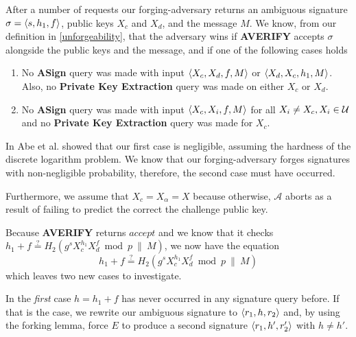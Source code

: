 After a number of requests our forging-adversary returns an ambiguous signature \(\sigma = \langle s,h_1, f \rangle\), public keys \(X_c\) and \(X_d\), and the message \(M\).
We know, from our definition in \autoref{unforgeability}, that the adversary wins if \textbf{AVERIFY} accepts \(\sigma\) alongside the public keys and the message, and if one of the following cases holds
  \begin{enumerate}
    \item No \textbf{ASign} query was made with input \(\langle X_c, X_d, f, M \rangle\) or \(\langle X_d, X_c, h_1, M \rangle\).
          Also, no \textbf{Private Key Extraction} query was made on either \(X_c\) or \(X_d\).
    \item No \textbf{ASign} query was made with input \(\langle X_c, X_i, f, M \rangle\) for all \(X_i \neq X_c, X_i\in\mathcal{U}\) and no \textbf{Private Key Extraction} query was made for \(X_c\).
  \end{enumerate}

In \cite{abe20021} Abe et al. showed that our first case is negligible, assuming the hardness of the discrete logarithm problem. 
We know that our forging-adversary forges signatures with non-negligible probability, therefore, the second case must have occurred.

Furthermore, we assume that \(X_c = X_\alpha = X\) because otherwise, \(\mathcal{A}\) aborts as a result of failing to predict the correct the challenge public key.

Because \textbf{AVERIFY} returns \(accept\) and we know that it checks \(h_1 + f \overset{?}{=} H_2(g^s X_{c}^{h_1} X_d^f \bmod p ~\|~ M)\), we now have the equation
\[h_1 + f \overset{?}{=} H_2(g^s X_{c}^{h_1} X_d^f \bmod p ~\|~ M)\]
which leaves two new cases to investigate.

In the \textit{first} case \(h = h_1 + f\) has never occurred in any signature query before.
If that is the case, we rewrite our ambiguous signature to \(\langle r_1, h, r_2 \rangle\) and, by using the forking lemma, force \(E\) to produce a second signature \(\langle r_1, h', r_2' \rangle\) with \(h\neq h'\).

